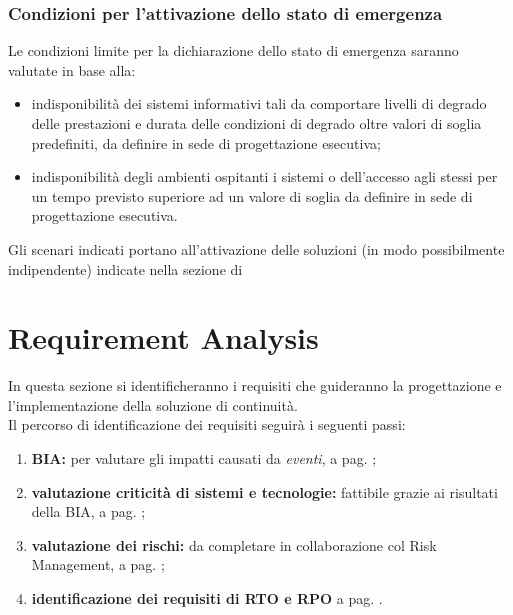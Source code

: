 \subsubsection{Condizioni per l'attivazione dello stato di emergenza}
Le condizioni limite per la dichiarazione dello stato 
di emergenza saranno valutate in base alla: 
\begin{itemize}
\item indisponibilità dei sistemi informativi tali da comportare livelli di degrado delle prestazioni e durata delle condizioni di degrado oltre valori di soglia predefiniti, da definire in sede di progettazione esecutiva;
\item indisponibilità degli ambienti ospitanti i sistemi o dell’accesso agli stessi per un tempo previsto superiore ad un valore di soglia da definire in sede di progettazione esecutiva.
\end{itemize}
Gli scenari indicati portano all'attivazione delle soluzioni (in modo possibilmente indipendente) indicate nella sezione di 








































\newpage
\section{Requirement Analysis}
\label{sec:requirementanalysis}
In questa sezione si identificheranno i requisiti che guideranno la progettazione e l'implementazione della soluzione di continuità.
\\Il percorso di identificazione dei requisiti seguirà i seguenti passi:
\begin{enumerate}
\item \textbf{BIA:} per valutare gli impatti causati da \textit{eventi}, a pag. \pageref{bia};
\item\textbf{valutazione criticità di sistemi e tecnologie:} fattibile grazie ai risultati della BIA, a pag. \pageref{critsisapp};
\item \textbf{valutazione dei rischi:} da completare in collaborazione col Risk Management, a pag. \pageref{rischi};
\item \textbf{identificazione dei requisiti di RTO e RPO} a pag. \pageref{rtorpo}.
\end{enumerate}


